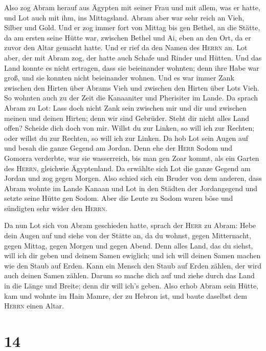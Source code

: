  Also zog Abram herauf aus Ägypten mit seiner Frau und mit
allem, was er hatte, und Lot auch mit ihm, ins Mittagsland.
 Abram aber war sehr reich an Vieh, Silber und Gold.
 Und er zog immer fort von Mittag bis gen Bethel, an die
Stätte, da am ersten seine Hütte war, zwischen Bethel und Ai,
 eben an den Ort, da er zuvor den Altar gemacht hatte. Und
er rief da den Namen des \textsc{Herrn} an.  Lot aber, der
mit Abram zog, der hatte auch Schafe und Rinder und Hütten.
 Und das Land konnte es nicht ertragen, dass sie
beieinander wohnten; denn ihre Habe war groß, und sie konnten nicht
beieinander wohnen.  Und es war immer Zank zwischen den
Hirten über Abrams Vieh und zwischen den Hirten über Lots Vieh. So
wohnten auch zu der Zeit die Kanaaniter und Pherisiter im Lande.
 Da sprach Abram zu Lot: Lass doch nicht Zank sein
zwischen mir und dir und zwischen meinen und deinen Hirten; denn wir
sind Gebrüder.  Steht dir nicht alles Land offen? Scheide
dich doch von mir. Willst du zur Linken, so will ich zur Rechten; oder
willst du zur Rechten, so will ich zur Linken.  Da hob
Lot sein Augen auf und besah die ganze Gegend am Jordan. Denn ehe der
\textsc{Herr} Sodom und Gomorra verderbte, war sie wasserreich, bis man
gen Zoar kommt, als ein Garten des \textsc{Herrn}, gleichwie
Ägyptenland.  Da erwählte sich Lot die ganze Gegend am
Jordan und zog gegen Morgen. Also schied sich ein Bruder von dem
anderen,  dass Abram wohnte im Lande Kanaan und Lot in
den Städten der Jordangegend und setzte seine Hütte gen Sodom.
 Aber die Leute zu Sodom waren böse und sündigten sehr
wider den \textsc{Herrn}.

 Da nun Lot sich von Abram geschieden hatte, sprach der
\textsc{Herr} zu Abram: Hebe dein Augen auf und siehe von der Stätte an,
da du wohnst, gegen Mitternacht, gegen Mittag, gegen Morgen und gegen
Abend.  Denn alles Land, das du siehst, will ich dir
geben und deinem Samen ewiglich;  und ich will deinen
Samen machen wie den Staub auf Erden. Kann ein Mensch den Staub auf
Erden zählen, der wird auch deinen Samen zählen.  Darum
so mache dich auf und ziehe durch das Land in die Länge und Breite; denn
dir will ich's geben.  Also erhob Abram sein Hütte, kam
und wohnte im Hain Mamre, der zu Hebron ist, und baute daselbst dem
\textsc{Herrn} einen Altar.

\hypertarget{section-13}{%
\section{14}\label{section-13}}

